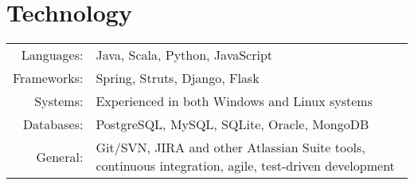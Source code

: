 \section{Technology}

\begin{tabular}{rl}
	Languages: & Java, Scala, Python, JavaScript \\
	Frameworks: & Spring, Struts, Django, Flask \\
	Systems: & Experienced in both Windows and Linux systems \\
	Databases: & PostgreSQL, MySQL, SQLite, Oracle, MongoDB \\
	General: & Git/SVN, JIRA and other Atlassian Suite tools, continuous integration, agile, test-driven development \\
\end{tabular}